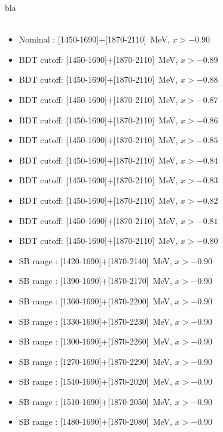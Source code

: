 \documentclass[12pt]{article}
\begin{document}
bla\\\\
{\footnotesize
\begin{itemize}
	\item  Nominal   : [1450-1690]+[1870-2110]~MeV, $x>-0.90$

	\item  BDT cutoff: [1450-1690]+[1870-2110]~MeV, $x>-0.89$
	\item  BDT cutoff: [1450-1690]+[1870-2110]~MeV, $x>-0.88$
	\item  BDT cutoff: [1450-1690]+[1870-2110]~MeV, $x>-0.87$
	\item  BDT cutoff: [1450-1690]+[1870-2110]~MeV, $x>-0.86$
	\item  BDT cutoff: [1450-1690]+[1870-2110]~MeV, $x>-0.85$
	\item  BDT cutoff: [1450-1690]+[1870-2110]~MeV, $x>-0.84$
	\item  BDT cutoff: [1450-1690]+[1870-2110]~MeV, $x>-0.83$
	\item  BDT cutoff: [1450-1690]+[1870-2110]~MeV, $x>-0.82$
	\item  BDT cutoff: [1450-1690]+[1870-2110]~MeV, $x>-0.81$
	\item  BDT cutoff: [1450-1690]+[1870-2110]~MeV, $x>-0.80$

	\item  SB range  : [1420-1690]+[1870-2140]~MeV, $x>-0.90$
	\item  SB range  : [1390-1690]+[1870-2170]~MeV, $x>-0.90$
	\item  SB range  : [1360-1690]+[1870-2200]~MeV, $x>-0.90$
	\item  SB range  : [1330-1690]+[1870-2230]~MeV, $x>-0.90$
	\item  SB range  : [1300-1690]+[1870-2260]~MeV, $x>-0.90$
	\item  SB range  : [1270-1690]+[1870-2290]~MeV, $x>-0.90$
	\item  SB range  : [1540-1690]+[1870-2020]~MeV, $x>-0.90$
	\item  SB range  : [1510-1690]+[1870-2050]~MeV, $x>-0.90$
	\item  SB range  : [1480-1690]+[1870-2080]~MeV, $x>-0.90$
\end{itemize}
}


\newpage
\end{document}
